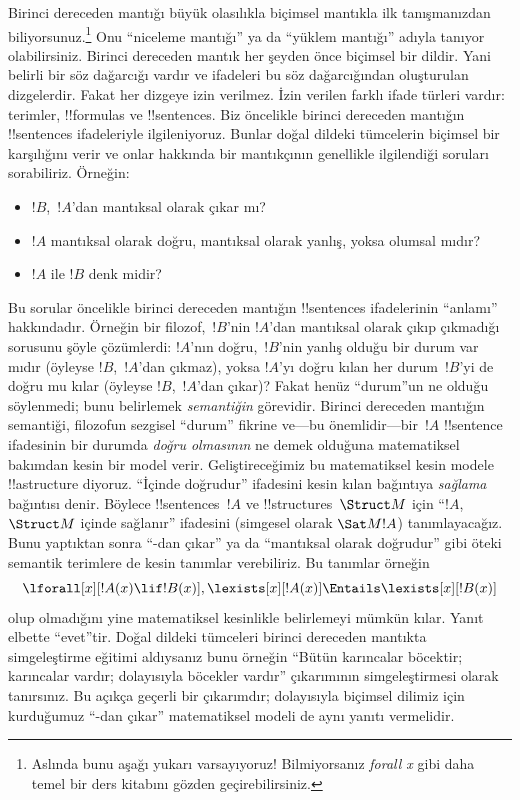 



Birinci dereceden mantığı büyük olasılıkla biçimsel mantıkla ilk
tanışmanızdan biliyorsunuz.\footnote{Aslında bunu aşağı yukarı
varsayıyoruz!{} Bilmiyorsanız \emph{forall x} \citep{Magnus2021} gibi
daha temel bir ders kitabını gözden geçirebilirsiniz.} Onu
``niceleme mantığı'' ya da ``yüklem mantığı'' adıyla tanıyor
olabilirsiniz. Birinci dereceden mantık her şeyden önce biçimsel bir
dildir. Yani belirli bir söz dağarcığı vardır ve ifadeleri bu söz
dağarcığından oluşturulan dizgelerdir. Fakat her dizgeye izin verilmez.
İzin verilen farklı ifade türleri vardır: terimler, !!{formula}s ve
!!{sentence}s. Biz öncelikle birinci dereceden mantığın
!!{sentence}s ifadeleriyle ilgileniyoruz. Bunlar doğal dildeki
tümcelerin biçimsel bir karşılığını verir ve onlar hakkında bir
mantıkçının genellikle ilgilendiği soruları sorabiliriz. Örneğin:
\begin{itemize}
    \item $!B$,~$!A$'dan mantıksal olarak çıkar mı?
    \item $!A$ mantıksal olarak doğru, mantıksal olarak yanlış, yoksa
olumsal mıdır?
    \item $!A$ ile $!B$ denk midir?
\end{itemize}

Bu sorular öncelikle birinci dereceden mantığın !!{sentence}s
ifadelerinin ``anlamı'' hakkındadır. Örneğin bir filozof,~$!B$'nin
$!A$'dan mantıksal olarak çıkıp çıkmadığı sorusunu şöyle çözümlerdi:
$!A$'nın doğru,~$!B$'nin yanlış olduğu bir durum var mıdır (öyleyse
$!B$,~$!A$'dan çıkmaz), yoksa $!A$'yı doğru kılan her durum~$!B$'yi
de doğru mu kılar (öyleyse $!B$,~$!A$'dan çıkar)? Fakat henüz
``durum''un ne olduğu söylenmedi; bunu belirlemek \emph{semantiğin}
görevidir. Birinci dereceden mantığın semantiği, filozofun sezgisel
``durum'' fikrine ve---bu önemlidir---bir~$!A$ !!{sentence} ifadesinin
bir durumda \emph{doğru olmasının} ne demek olduğuna matematiksel
bakımdan kesin bir model verir. Geliştireceğimiz bu matematiksel kesin
modele !!a{structure} diyoruz. ``İçinde doğrudur'' ifadesini kesin
kılan bağıntıya \emph{sağlama} bağıntısı denir. Böylece
!!{sentence}s~$!A$ ve !!{structure}s~$\Struct M$ için
``$!A$,~$\Struct M$ içinde sağlanır'' ifadesini (simgesel olarak
$\Sat M{!A}$) tanımlayacağız. Bunu yaptıktan sonra ``-dan çıkar'' ya da
``mantıksal olarak doğrudur'' gibi öteki semantik terimlere de kesin
tanımlar verebiliriz. Bu tanımlar örneğin
\[
\lforall[x][!A(x)\lif !B(x)],
\lexists[x][!A(x)] \Entails \lexists[x][!B(x)]
\]
olup olmadığını yine matematiksel kesinlikle belirlemeyi mümkün kılar.
Yanıt elbette ``evet''tir. Doğal dildeki tümceleri birinci dereceden
mantıkta simgeleştirme eğitimi aldıysanız bunu örneğin ``Bütün
karıncalar böcektir; karıncalar vardır; dolayısıyla böcekler vardır''
çıkarımının simgeleştirmesi olarak tanırsınız. Bu açıkça geçerli bir
çıkarımdır; dolayısıyla biçimsel dilimiz için kurduğumuz ``-dan çıkar''
matematiksel modeli de aynı yanıtı vermelidir.

